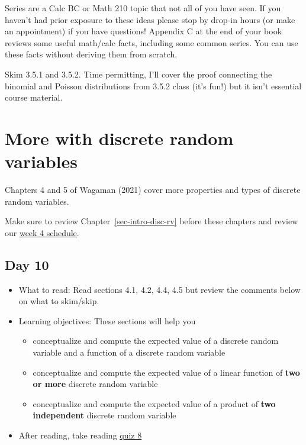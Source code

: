 \documentclass[
  letterpaper,
]{scrbook}
\providecommand{\tightlist}{%
  \setlength{\itemsep}{0pt}\setlength{\parskip}{0pt}}\usepackage{longtable,booktabs,array}
\begin{document}
Series are a Calc BC or Math 210 topic that not all of you have seen. If
you haven't had prior exposure to these ideas please stop by drop-in
hours (or make an appointment) if you have questions! Appendix C at the
end of your book reviews some useful math/calc facts, including some
common series. You can use these facts without deriving them from
scratch.

Skim 3.5.1 and 3.5.2. Time permitting, I'll cover the proof connecting
the binomial and Poisson distributions from 3.5.2 class (it's fun!) but
it isn't essential course material.


\chapter{More with discrete random variables}\label{sec-more-disc-rv}

Chapters 4 and 5 of Wagaman (2021) cover more properties and types of
discrete random variables.

Make sure to review Chapter~\ref{sec-intro-disc-rv} before these
chapters and review our
\href{https://docs.google.com/spreadsheets/d/1DcSJuVX8xt5VTa5RV1PMZRaRvEhlWqvQaN7IacuW-ww/edit?usp=sharing}{week
4 schedule}.

\section*{Day 10}\label{day-10}


\begin{itemize}
\item
  What to read: Read sections 4.1, 4.2, 4.4, 4.5 but review the comments
  below on what to skim/skip.
\item
  Learning objectives: These sections will help you

  \begin{itemize}
  \tightlist
  \item
    conceptualize and compute the expected value of a discrete random
    variable and a function of a discrete random variable
  \item
    conceptualize and compute the expected value of a linear function of
    \textbf{two or more} discrete random variable
  \item
    conceptualize and compute the expected value of a product of
    \textbf{two independent} discrete random variable
  \end{itemize}
\item
  After reading, take reading
  \href{https://forms.gle/Hguw2WYckTfeXiE89}{quiz 8}
\end{itemize}
\end{document}
